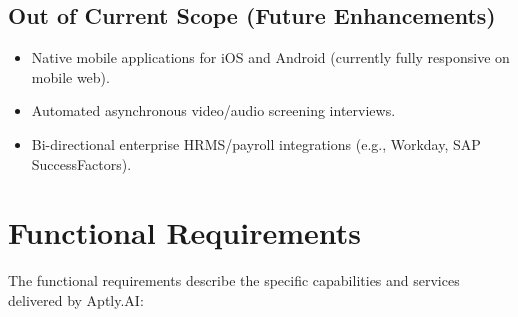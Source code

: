 \documentclass[12pt, a4paper]{article}
\begin{document}
\subsection{Out of Current Scope (Future Enhancements)}
\begin{itemize}[leftmargin=1.5em, itemsep=2pt]
    \item Native mobile applications for iOS and Android (currently fully responsive on mobile web).
    \item Automated asynchronous video/audio screening interviews.
    \item Bi-directional enterprise HRMS/payroll integrations (e.g., Workday, SAP SuccessFactors).
\end{itemize}

\section{Functional Requirements}
The functional requirements describe the specific capabilities and services delivered by Aptly.AI:
\end{document}
